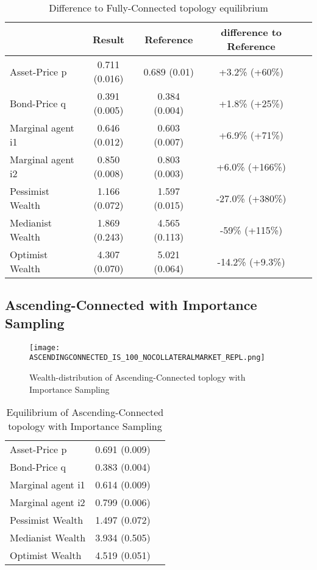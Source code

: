 \documentclass[Bachelorarbeit.tex]{subfiles}
\begin{document}
\begin{table}[H]
	\caption{Difference to Fully-Connected topology equilibrium}
	\centering
	\begin{tabular} { l c c c r }
		& Result & Reference & difference to Reference \\
		\hline
		Asset-Price p & 0.711 (0.016) & 0.689 (0.01) & +3.2\% (+60\%) \\
		Bond-Price q & 0.391 (0.005) & 0.384 (0.004) & +1.8\% (+25\%) \\
		Marginal agent i1 & 0.646 (0.012) & 0.603 (0.007) & +6.9\% (+71\%) \\
		Marginal agent i2 & 0.850 (0.008) & 0.803 (0.003) & +6.0\% (+166\%) \\
		\hline
		Pessimist Wealth & 1.166 (0.072) & 1.597 (0.015) & -27.0\% (+380\%) \\
		Medianist Wealth & 1.869 (0.243) & 4.565 (0.113) & -59\% (+115\%) \\
		Optimist Wealth & 4.307 (0.070) & 5.021 (0.064) & -14.2\% (+9.3\%) \\
		\hline
	\end{tabular}
\end{table}

\subsection{Ascending-Connected with Importance Sampling}
\begin{figure}[H]
	\centering
  \texttt{[image: ASCENDINGCONNECTED\_IS\_100\_NOCOLLATERALMARKET\_REPL.png]}
	\caption{Wealth-distribution of Ascending-Connected toplogy with Importance Sampling}
	\label{fig:wealth_ASCENDINGCONNECTED_IS_100_NOCOLLATERALMARKET_REPL}
\end{figure}

\begin{table}[H]
	\caption{Equilibrium of Ascending-Connected topology with Importance Sampling}
	\centering
	\begin{tabular} { l c r }
		\hline
		Asset-Price p & 0.691 (0.009) \\
		Bond-Price q & 0.383 (0.004) \\
		Marginal agent i1 & 0.614 (0.009) \\
		Marginal agent i2 & 0.799 (0.006) \\
		\hline
		Pessimist Wealth & 1.497 (0.072) \\
		Medianist Wealth & 3.934 (0.505) \\
		Optimist Wealth & 4.519 (0.051) \\
		\hline
	\end{tabular}
\end{table} 
\end{document}
